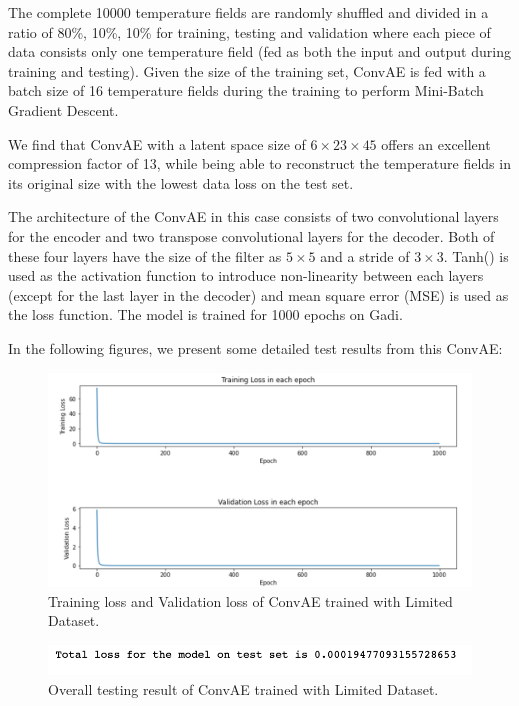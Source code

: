 The complete 10000 temperature fields are randomly shuffled and divided in a ratio of 80\%, 10\%, 10\% for training, testing and validation where each piece of data consists only one temperature field (fed as both the input and output during training and testing). Given the size of the training set, ConvAE is fed with a batch size of 16 temperature fields during the training to perform Mini-Batch Gradient Descent.

We find that ConvAE with a latent space size of $6 \times 23 \times 45$ offers an excellent compression factor of 13, while being able to reconstruct the temperature fields in its original size with the lowest data loss on the test set.

The architecture of the ConvAE in this case consists of two convolutional layers for the encoder and two transpose convolutional layers for the decoder. Both of these four layers have the size of the filter as $5 \times 5$ and a stride of $3 \times 3$. Tanh() is used as the activation function to introduce non-linearity between each layers (except for the last layer in the decoder) and mean square error (MSE) is used as the loss function. The model is trained for 1000 epochs on Gadi.

In the following figures, we present some detailed test results from this ConvAE:

\begin{figure}[H]
    \caption{Training loss and Validation loss of ConvAE trained with Limited Dataset.}
    \includegraphics[scale=0.6]{figures/mantle_convection_images/limited_dataset/ConvAE_trainingData.png}
\end{figure}

\begin{figure}[H]
    \caption{Overall testing result of ConvAE trained with Limited Dataset.}
    \includegraphics[scale=0.8]{figures/mantle_convection_images/limited_dataset/ConvAE_OverallTesting.png}
\end{figure}

